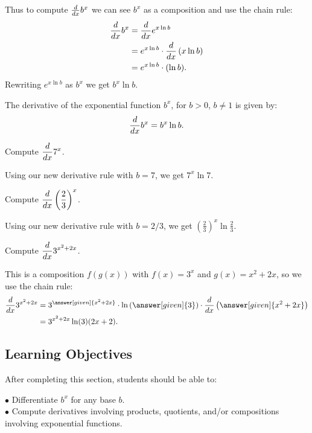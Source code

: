 \documentclass{ximera}
\begin{document}
Thus to compute $\frac{d}{\mathop{}\!d x} b^x$ we can see $b^x$ as a composition and use the chain rule:
\begin{align*} 
	\frac{d}{\mathop{}\!d x} b^x &= \frac{d}{\mathop{}\!d x} e^{x \ln b}\\
		&= e^{x \ln b} \cdot \frac{d}{\mathop{}\!d x} \left( x \ln b \right)\\ 
		&= e^{x \ln b} \cdot (\ln b).
\end{align*}
Rewriting $e^{x \ln b}$ as $b^x$ we get $b^x\ln b$.
\begin{theorem}
	The derivative of the exponential function $b^x$, for $b > 0$, $b \neq 1$ is given by:
	\[ \frac{d}{\mathop{}\!d x} b^x = b^x \ln b. \]
\end{theorem}

\begin{example}
	Compute $\displaystyle \frac{d}{\mathop{}\!d x} 7^x$.
	\begin{explanation}
		Using our new derivative rule with $b = 7$, we get  $\displaystyle 7^x \ln 7$.
	\end{explanation}
\end{example}

\begin{example}
	Compute $\displaystyle \frac{d}{\mathop{}\!d x} \left(\frac{2}{3}\right)^x$.
	\begin{explanation}
		Using our new derivative rule with $b = 2/3$, we get  $\displaystyle \left(\frac{2}{3}\right)^x \ln \frac{2}{3}$.
	\end{explanation}
\end{example}

\begin{example}
	Compute $\displaystyle \frac{d}{\mathop{}\!d x} 3^{x^2+2x}$.
	\begin{explanation}
		This is a composition $f(g(x))$ with $f(x)=3^x$ and $g(x)=x^2+2x$, so we use the chain rule:
		\begin{align*}
			\ddx 3^{x^2 + 2x} &= 3^{\answer[given]{x^2+2x}} \cdot \ln \left( \answer[given]{3} \right) \cdot \ddx \left(  \answer[given]{x^2+2x}\right)\\
				&= 3^{x^2+2x} \ln(3) (2x+2).
		\end{align*}
	\end{explanation}
\end{example}


\subsection{Learning Objectives}
After completing this section, students should be able to:
\vspace{.05in}

\noindent$\bullet$ Differentiate $b^x$ for any base $b$.
\\$\bullet$ Compute derivatives involving products, quotients, and/or compositions involving exponential functions.





\end{document}

